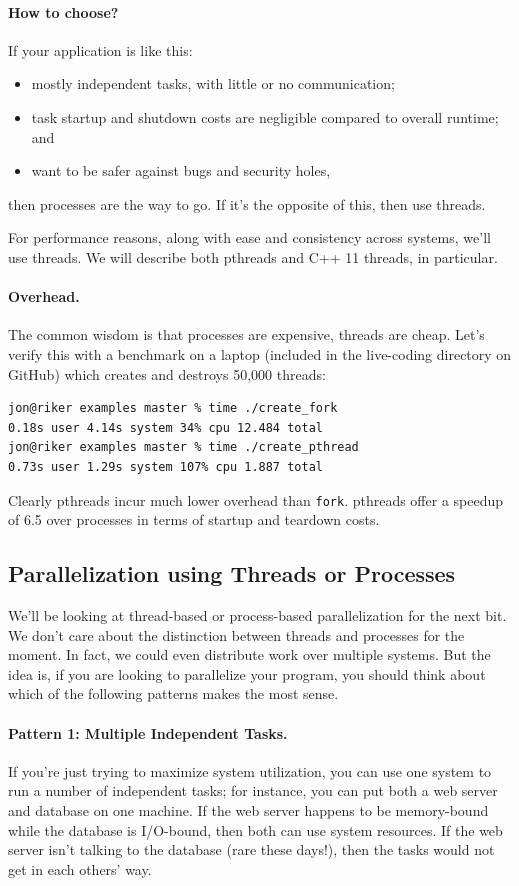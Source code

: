 \documentclass[a4paper]{report}
\begin{document}
\paragraph{How to choose?}
  If your application is like this:
  \begin{itemize}
    \item mostly independent tasks, with little or no communication;
    \item task startup and shutdown costs are negligible compared to overall runtime; and
    \item want to be safer against bugs and security holes,
  \end{itemize}
then processes are the way to go. If it's the opposite of this, then use threads.

For performance reasons, along with ease and consistency across systems, we'll use threads. We will describe both pthreads and C++ 11 threads, in particular.

\paragraph{Overhead.} The common wisdom is that processes are
expensive, threads are cheap. Let's verify this with a benchmark on a
laptop (included in the live-coding directory on GitHub) which creates and destroys 50,000 threads:
  \begin{lstlisting}[basicstyle=\scriptsize]
jon@riker examples master % time ./create_fork 
0.18s user 4.14s system 34% cpu 12.484 total
jon@riker examples master % time ./create_pthread 
0.73s user 1.29s system 107% cpu 1.887 total
  \end{lstlisting}

Clearly pthreads incur much lower overhead than {\tt fork}. pthreads
offer a speedup of 6.5 over processes in terms of startup and teardown costs.

\subsection*{Parallelization using Threads or Processes}
We'll be looking at thread-based or process-based parallelization for the
next bit. We don't care about the distinction between threads and processes
for the moment. In fact, we could even distribute work over multiple systems. But the idea is, if you are looking to parallelize your program, you should think about which of the following patterns makes the most sense.

\paragraph{Pattern 1: Multiple Independent Tasks.} If you're just trying to maximize
system utilization, you can use one system to run a number of independent
tasks; for instance, you can put both a web server and database on
one machine. If the web server happens to be memory-bound while the
database is I/O-bound, then both can use system resources. If the web
server isn't talking to the database (rare these days!), then the tasks
would not get in each others' way.
\end{document}
